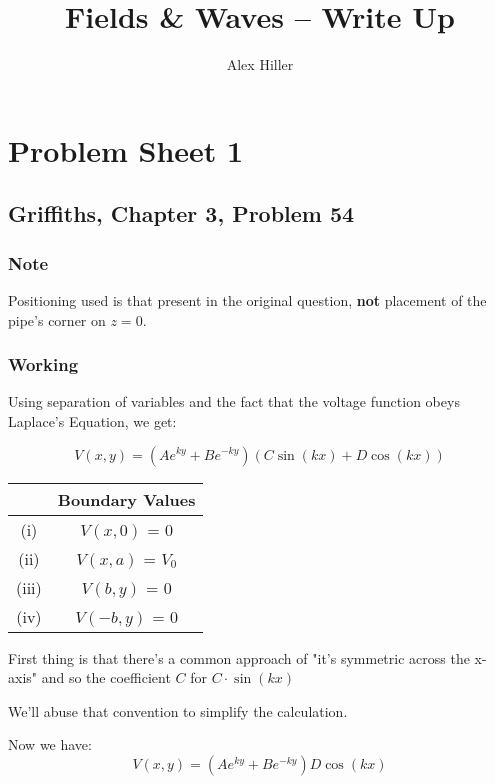 \documentclass{article}
\author{Alex Hiller}
\title{Fields \& Waves -- Write Up}
\begin{document}
\maketitle 
\tableofcontents
\clearpage

\section{Problem Sheet 1} 

\subsection{Griffiths, Chapter 3, Problem 54}

\subsubsection{Note} 
Positioning used is that present in the original question, \textbf{not} placement
of the pipe's corner on $z=0$.

\subsubsection{Working} 
Using separation of variables and the fact that the voltage function obeys Laplace's Equation, we get:

\[%
    V(x,y) 
    =
    (A e^{ky}+ B e^{-ky})
    \left(C \sin\left(kx\right) 
    +
    D \cos\left(kx\right) \right)
\]%

\begin{table}[!htbp]
    \centering
    \begin{tabular}{|c|c|} \hline
        & Boundary Values  \\ \hline
        (i) & $ V(x,0) $ = 0      \\ \hline
        (ii) & $ V(x,a) $ = $V_0$  \\ \hline
        (iii) & $ V(b,y) $ = 0 \\ \hline
        (iv) & $ V(-b,y)$ = 0 \\ \hline
    \end{tabular}
\end{table}

First thing is that there's a common approach of "it's symmetric across the
x-axis" and so the coefficient $C$ for $C \cdot \sin\left(kx\right) $

We'll abuse that convention to simplify the calculation.

Now we have:
\[%
    V(x,y) 
    =
    (A e^{ky}+ B e^{-ky})
    D \cos\left(kx\right) 
\]%
\end{document}
